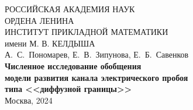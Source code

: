 \documentclass[a4paper,12pt]{article}
\theoremstyle{plain}
\theoremstyle{remark}
\newcommand{\PreprintTitleFormatted}{
	Численное исследование обобщения \\ модели развития канала электрического пробоя \\ типа <<диффузной границы>>
}
\newcommand{\PreprintAuthors}{
	А.~С.~Пономарев, Е.~В.~Зипунова, Е.~Б.~Савенков
}
\begin{document}
\begin{titlepage}

\begin{center}
	РОССИЙСКАЯ АКАДЕМИЯ НАУК \\
	ОРДЕНА ЛЕНИНА \\
	ИНСТИТУТ ПРИКЛАДНОЙ МАТЕМАТИКИ \\
	имени М. В. КЕЛДЫША \\

	\vspace*{60mm}
	{
		\Large{\PreprintAuthors} \\
	}
	\vspace*{20mm}
	{
		\large \textbf{\PreprintTitleFormatted} \\
	}
	\vspace*{110mm}
	\Large{Москва, 2024}
	\vspace*{-50mm}
\end{center}

\end{titlepage}

\setcounter{page}{2}

\thispagestyle{empty}
\end{document}
